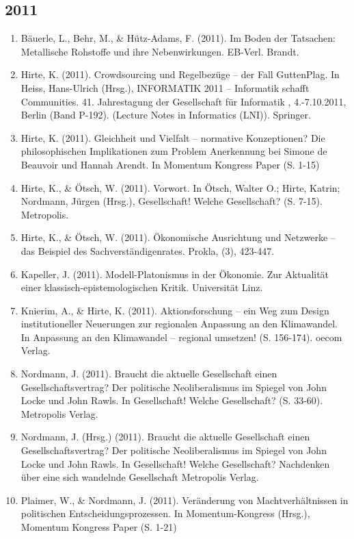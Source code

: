 \subsection*{2011}
\begin{enumerate}
	 \item Bäuerle, L., Behr, M., \& Hütz-Adams, F. (2011). Im Boden der Tatsachen: Metallische Rohstoffe und ihre Nebenwirkungen. EB-Verl. Brandt.
	 \item Hirte, K. (2011). Crowdsourcing und Regelbezüge -- der Fall GuttenPlag. In Heiss, Hans-Ulrich (Hrsg.), INFORMATIK 2011 -- Informatik schafft Communities. 41. Jahrestagung der Gesellschaft für Informatik , 4.-7.10.2011, Berlin (Band P-192). (Lecture Notes in Informatics (LNI)). Springer.
	 \item Hirte, K. (2011). Gleichheit und Vielfalt – normative Konzeptionen? Die philosophischen Implikationen zum Problem Anerkennung bei Simone de Beauvoir und Hannah Arendt. In Momentum Kongress Paper (S. 1-15)
	 \item Hirte, K., \& Ötsch, W. (2011). Vorwort. In Ötsch, Walter O.; Hirte, Katrin; Nordmann, Jürgen (Hrsg.), Gesellschaft! Welche Gesellschaft? (S. 7-15). Metropolis.
	 \item Hirte, K., \& Ötsch, W. (2011). Ökonomische Ausrichtung und Netzwerke -- das Beispiel des Sachverständigenrates. Prokla, (3), 423-447.
	 \item Kapeller, J. (2011). Modell-Platonismus in der Ökonomie. Zur Aktualität einer klassisch-epistemologischen Kritik. Universität Linz.
	 \item Knierim, A., \& Hirte, K. (2011). Aktionsforschung -- ein Weg zum Design institutioneller Neuerungen zur regionalen Anpassung an den Klimawandel. In Anpassung an den Klimawandel -- regional umsetzen! (S. 156-174). oecom Verlag.
	 \item Nordmann, J. (2011). Braucht die aktuelle Gesellschaft einen Gesellschaftsvertrag? Der politische Neoliberalismus im Spiegel von John Locke und John Rawls. In Gesellschaft! Welche Gesellschaft? (S. 33-60). Metropolis Verlag.
	 \item Nordmann, J. (Hrsg.) (2011). Braucht die aktuelle Gesellschaft einen Gesellschaftsvertrag? Der politische Neoliberalismus im Spiegel von John Locke und John Rawls. In Gesellschaft! Welche Gesellschaft? Nachdenken über eine sich wandelnde Gesellschaft Metropolis Verlag.
	 \item Plaimer, W., \& Nordmann, J. (2011). Veränderung von Machtverhältnissen in politischen Entscheidungsprozessen. In Momentum-Kongress (Hrsg.), Momentum Kongress Paper (S. 1-21)

\end{enumerate}
